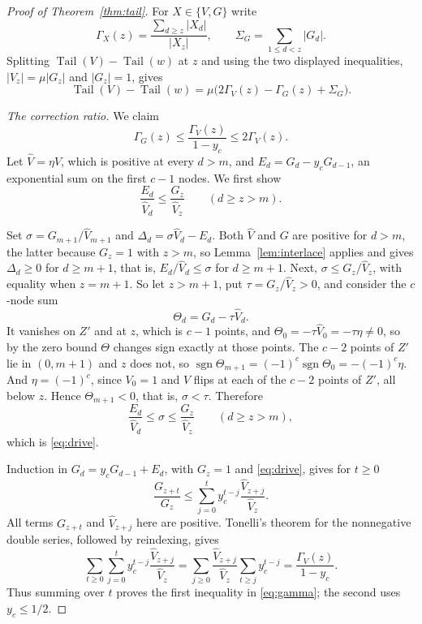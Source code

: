 \documentclass[11pt]{article}
\DeclareMathOperator{\Tail}{Tail}
\DeclareMathOperator{\sgn}{sgn}
\begin{document}
\begin{proof}[Proof of Theorem~\ref{thm:tail}]
For $X\in\{V,G\}$ write
\[
  \Gamma_X(z)=\frac{\sum_{d\ge z}|X_d|}{|X_z|},
  \qquad \Sigma_G=\sum_{1\le d<z}|G_d|.
\]
Splitting $\Tail(V)-\Tail(w)$ at $z$ and using the two displayed
inequalities, $|V_z|=\mu|G_z|$ and $|G_z|=1$, gives
\begin{equation}\label{eq:split}
  \Tail(V)-\Tail(w)
  =\mu\bigl(2\Gamma_V(z)-\Gamma_G(z)+\Sigma_G\bigr).
\end{equation}

\emph{The correction ratio.}  We claim
\begin{equation}\label{eq:gamma}
  \Gamma_G(z)\le\frac{\Gamma_V(z)}{1-y_c}\le2\Gamma_V(z).
\end{equation}
Let $\widehat V=\eta V$, which is positive at every $d>m$, and
$E_d=G_d-y_cG_{d-1}$, an exponential sum on the first $c-1$ nodes.  We first
show
\begin{equation}\label{eq:drive}
  \frac{E_d}{\widehat V_d}\le
  \frac{G_z}{\widehat V_z}\qquad(d\ge z>m).
\end{equation}

Set $\sigma=G_{m+1}/\widehat V_{m+1}$ and
$\Delta_d=\sigma\widehat V_d-E_d$.  Both $\widehat V$ and $G$ are positive for
$d>m$, the latter because $G_z=1$ with $z>m$, so Lemma~\ref{lem:interlace}
applies and gives $\Delta_d\ge0$ for $d\ge m+1$, that is,
$E_d/\widehat V_d\le\sigma$ for $d\ge m+1$.  Next, $\sigma\le G_z/\widehat V_z$, with equality
when $z=m+1$.  So let $z>m+1$, put $\tau=G_z/\widehat V_z>0$, and consider
the $c$-node sum
\[
  \Theta_d=G_d-\tau\widehat V_d .
\]
It vanishes on $Z'$ and at $z$, which is $c-1$ points, and
$\Theta_0=-\tau\widehat V_0=-\tau\eta\ne0$, so by the zero bound $\Theta$
changes sign exactly at those points.  The $c-2$ points of $Z'$ lie in
$(0,m+1)$ and $z$ does not, so $\sgn\Theta_{m+1}=(-1)^{c}\sgn\Theta_0
=-(-1)^{c}\eta$.  And $\eta=(-1)^{c}$, since $V_0=1$ and $V$ flips at each of
the $c-2$ points of $Z'$, all below $z$.  Hence $\Theta_{m+1}<0$, that is,
$\sigma<\tau$.  Therefore
\[
  \frac{E_d}{\widehat V_d}\le\sigma\le\frac{G_z}{\widehat V_z}
  \qquad(d\ge z>m),
\]
which is \eqref{eq:drive}.

Induction in $G_d=y_cG_{d-1}+E_d$, with $G_z=1$ and
\eqref{eq:drive}, gives for $t\ge0$
\[
  \frac{G_{z+t}}{G_z}
  \le\sum_{j=0}^t y_c^{t-j}
       \frac{\widehat V_{z+j}}{\widehat V_z}.
\]
All terms $G_{z+t}$ and $\widehat V_{z+j}$ here are positive.  Tonelli's
theorem for the nonnegative double series, followed by reindexing, gives
\[
 \sum_{t\ge0}\sum_{j=0}^t y_c^{t-j}
       \frac{\widehat V_{z+j}}{\widehat V_z}
 =\sum_{j\ge0}\frac{\widehat V_{z+j}}{\widehat V_z}
       \sum_{t\ge j}y_c^{t-j}
 =\frac{\Gamma_V(z)}{1-y_c}.
\]
Thus summing over $t$ proves the first inequality in \eqref{eq:gamma}; the
second uses $y_c\le1/2$.


\end{proof}
\end{document}
